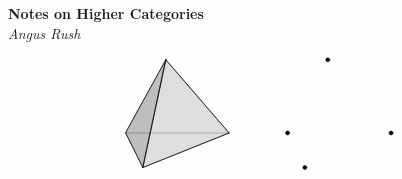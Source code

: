 \documentclass[a4paper,12pt]{scrbook}
\begin{document}
\begin{titlepage}
   \begin{center}
     \Huge\textbf{Notes on Higher Categories}\\
     \vspace*{1em}
     \Large\textit{Angus Rush}
   \end{center}
   \begin{equation*}
     \begin{aligned}
       \begin{tikzpicture}[line join = round, scale=1.5, line cap = round]
         \coordinate (3) at (0,{sqrt(2)},0);
         \coordinate (2) at ({-.5*sqrt(3)},0,-.5);
         \coordinate (1) at (0,0,1);
         \coordinate (0) at ({.5*sqrt(3)},0,-.5);

         \draw[densely dotted,] (0)--(2);
         \draw[fill=lightgray,fill opacity=.5] (1)--(0)--(3)--cycle;
         \draw[fill=gray,fill opacity=.5] (2)--(1)--(3)--cycle;
         \draw (1)--(0);
         \draw (1)--(2);
         \draw (2)--(3);
         \draw (1)--(3);
         \draw (0)--(3);
       \end{tikzpicture}
     \end{aligned}
     \qquad\qquad
     \begin{aligned}
       \begin{tikzpicture}[dot/.style={draw,circle,minimum size=1mm,inner sep=0pt,outer sep=0pt,fill=black}, line join = round, scale=1.5, line cap = round]

         \coordinate[draw, dot] (3) at (0,{sqrt(2)},0);
         \coordinate[draw, dot] (2) at ({.5*sqrt(3)},0,-.5);
         \coordinate[draw, dot] (1) at (0,0,1);
         \coordinate[draw, dot] (0) at ({-.5*sqrt(3)},0,-.5);


\end{tikzpicture}
\end{aligned}
\end{equation*}
\end{titlepage}
\end{document}
